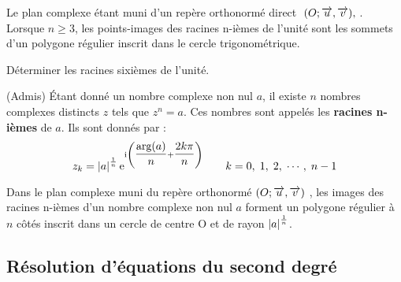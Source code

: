 \begin{remark}
Le plan complexe étant muni d'un repère orthonormé direct $\; (O ;\overrightarrow{u},\overrightarrow{v}),\; $. Lorsque $ n\geq 3 $, les
points-images des racines n-ièmes de l'unité sont les sommets d'un polygone régulier inscrit dans
le cercle trigonométrique.
\end{remark}
\begin{exercice}
Déterminer les racines sixièmes de l'unité.
\end{exercice} 
\begin{theorem}{(Admis)}
Étant donné un nombre complexe non nul $ a $, il existe $ n $ nombres complexes distincts  $ z $ tels que \; $ z^n=a $. Ces nombres sont appelés les \textbf{racines n-ièmes} de $ a $. Ils sont donnés par :
\[ z_k=\left\lvert a \right\rvert^{\frac{1}{n}}\mathrm{e}^{\text{i}\left(\dfrac{\text{arg}(a)}{n}+\dfrac{2k\pi}{n}\right) }\qquad k=0, \; 1, \; 2 ,\; \cdots, \;n-1\]
\end{theorem}
\begin{property}
Dans le plan complexe muni du repère orthonormé $ (O ;\overrightarrow{u},\overrightarrow{v}) $ , les images des racines
n-ièmes d'un nombre complexe non nul $ a $ forment un polygone régulier à $ n $ côtés inscrit dans un cercle de centre O et de rayon $ \left\lvert a \right\rvert^{\frac{1}{n}} $.
\end{property}

\subsection{Résolution d'équations du second degré}

